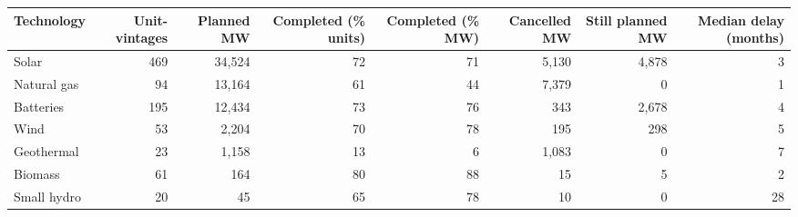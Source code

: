 \begin{tabular}{lrrrrrrr}
\toprule
Technology & Unit-vintages & Planned MW & Completed (\% units) & Completed (\% MW) & Cancelled MW & Still planned MW & Median delay (months) \\
\midrule
Solar & 469 & 34,524 & 72 & 71 & 5,130 & 4,878 & 3 \\
Natural gas & 94 & 13,164 & 61 & 44 & 7,379 & 0 & 1 \\
Batteries & 195 & 12,434 & 73 & 76 & 343 & 2,678 & 4 \\
Wind & 53 & 2,204 & 70 & 78 & 195 & 298 & 5 \\
Geothermal & 23 & 1,158 & 13 & 6 & 1,083 & 0 & 7 \\
Biomass & 61 & 164 & 80 & 88 & 15 & 5 & 2 \\
Small hydro & 20 & 45 & 65 & 78 & 10 & 0 & 28 \\
\bottomrule
\end{tabular}